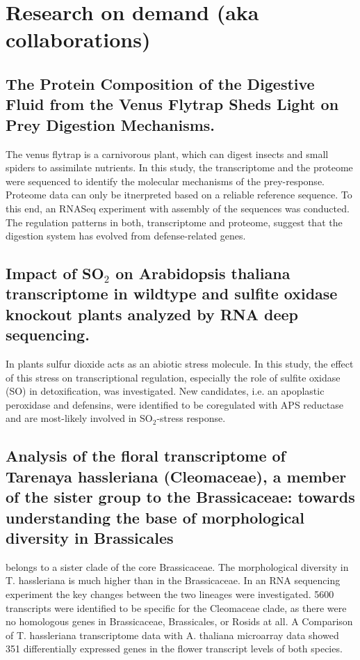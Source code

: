 \section{Research on demand (aka collaborations)}
\subsection{The Protein Composition of the Digestive Fluid
from the Venus Flytrap Sheds Light on Prey
Digestion Mechanisms. \cite{mp_Schulze2012}}
The venus flytrap is a carnivorous plant, which can digest insects and small spiders to assimilate nutrients.
In this study, the transcriptome and the proteome were sequenced to identify the molecular mechanisms of the prey-response.
Proteome data can only be itnerpreted based on a reliable reference sequence.
To this end, an RNASeq experiment with  assembly of the sequences was conducted.
The regulation patterns in both, transcriptome and proteome, suggest that the digestion system has evolved from defense-related genes.

\subsection{Impact of SO$_2$ on Arabidopsis thaliana transcriptome in wildtype and sulfite oxidase knockout plants analyzed by RNA deep sequencing.\cite{mp_Hamisch2012}}
In plants sulfur dioxide acts as an abiotic stress molecule.
In this study, the effect of this stress on transcriptional regulation, especially the role of sulfite oxidase (SO) in detoxification, was investigated.
New candidates, i.e. an apoplastic peroxidase and defensins, were identified to be coregulated with APS reductase and are most-likely involved in SO$_2$-stress response.

\subsection{Analysis of the floral transcriptome of Tarenaya hassleriana (Cleomaceae), a member of the sister group to the Brassicaceae: towards understanding the base of morphological diversity in Brassicales \cite{mp_Bhide2014}}
 belongs to a sister clade of the core Brassicaceae.
The morphological diversity in T. hassleriana is much higher than in the Brassicaceae.
In an RNA sequencing experiment the key changes between the two lineages were investigated.
5600 transcripts were identified to be specific for the Cleomaceae clade, as there were no homologous genes in Brassicaceae, Brassicales, or Rosids at all.
A Comparison of T. hassleriana transcriptome data with A. thaliana microarray data showed 351 differentially expressed genes in the flower transcript levels of both species.


